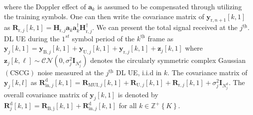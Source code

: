 \documentclass[conference]{IEEEtran}
\newcommand{\paren}[1]{\left({#1}\right)}
\newcommand{\bracket}[1]{{\left [{#1}\right ]}}
\newcommand{\braces}[1]{{\left\{ {#1}\right\}}}
\newcommand{\ith}[1]    {{#1}^{\underline{\text{th}}}}
\begin{document}
where the Doppler effect of $\mathbf{a}_k$ is assumed to be compensated through utilizing the training symbols. One can then write the covariance matrix of $\mathbf{y}_{\mathrm{r},n+1}\bracket{k,1}$ as $\mathbf{R}_{\mathrm{r},j}\bracket{k,1}=\mathbf{H}_{\mathrm{r},j}\mathbf{a}_k\mathbf{a}^\dagger_k\mathbf{H}^\dagger_{\mathrm{r},j}$. We can present the total signal received at the $\ith{j}$. DL UE during the $1^{st}$ symbol period of the $\ith{k}$ frame as $\mathbf{y}_{j}\bracket{k,1}=\mathbf{y}_{\mathrm{B},j}\bracket{k,1}+\mathbf{y}_{\mathrm{U},j}\bracket{k,1}+\mathbf{y}_{\mathrm{r},j}\bracket{k,1}+\mathbf{z}_{j}\bracket{k,1}$
where $\mathbf{z}_j\bracket{k,\ell}\sim\mathcal{CN}\paren{0,\sigma^2_j\mathbf{I}_{N^{\text{d}}_j}}$ denotes the circularly symmetric complex Gaussian $\paren{\text{CSCG}}$ noise measured at the $\ith{j}$ DL UE, i.i.d in $k$. The covariance matrix of $\mathbf{y}_{j}\bracket{k,l}$ as $	\mathbf{R}^\text{d}_{\mathrm{in},j}\bracket{k,1}=\mathbf{R}_{\mathrm{MUI},j}\bracket{k,1}+\mathbf{R}_{\mathrm{U,}j}\bracket{k,1}+\mathbf{R}_{\mathrm{r},j}\bracket{k,1}+\sigma^2_j\mathbf{I}_{N^{\text{d}}_j}$.
The overall covariance matrix of $\mathbf{y}_{j}\bracket{k,1}$ is denoted by $\mathbf{R}^\mathrm{d}_j\bracket{k,1}=\mathbf{R}_{\mathrm{B,j}}\bracket{k,1}+\mathbf{R}^\mathrm{d}_{\mathrm{in,}j}\bracket{k,1}$ for all $k\in\mathbb{Z}^+\braces{K}$.
	
\end{document}
